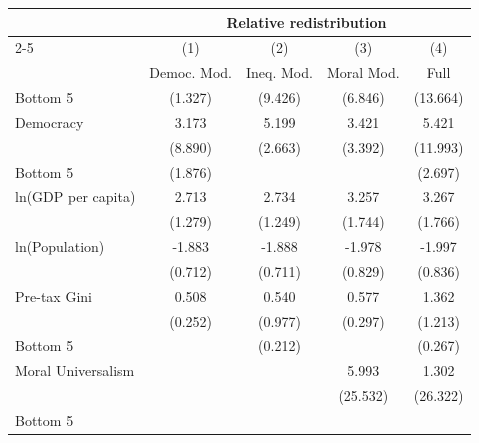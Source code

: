 \begin{tabular}{l*{4}{c}}
\toprule
                    &\multicolumn{4}{c}{Relative redistribution}        \\\cmidrule(lr){2-5}
                    &\multicolumn{1}{c}{(1)}&\multicolumn{1}{c}{(2)}&\multicolumn{1}{c}{(3)}&\multicolumn{1}{c}{(4)}\\
                    &\multicolumn{1}{c}{Democ. Mod.}&\multicolumn{1}{c}{Ineq. Mod.}&\multicolumn{1}{c}{Moral Mod.}&\multicolumn{1}{c}{Full}\\
\midrule
Bottom 5%
                    &     (1.327)&     (9.426)&     (6.846)&    (13.664)\\
\addlinespace
Democracy           &       3.173&       5.199&       3.421&       5.421\\
                    &     (8.890)&     (2.663)&     (3.392)&    (11.993)\\
\addlinespace
Bottom 5%
                    &     (1.876)&            &            &     (2.697)\\
\addlinespace
ln(GDP per capita)  &       2.713&       2.734&       3.257&       3.267\\
                    &     (1.279)&     (1.249)&     (1.744)&     (1.766)\\
\addlinespace
ln(Population)      &      -1.883&      -1.888&      -1.978&      -1.997\\
                    &     (0.712)&     (0.711)&     (0.829)&     (0.836)\\
\addlinespace
Pre-tax Gini        &       0.508&       0.540&       0.577&       1.362\\
                    &     (0.252)&     (0.977)&     (0.297)&     (1.213)\\
\addlinespace
Bottom 5%
                    &            &     (0.212)&            &     (0.267)\\
\addlinespace
Moral Universalism  &            &            &       5.993&       1.302\\
                    &            &            &    (25.532)&    (26.322)\\
\addlinespace
Bottom 5%

\end{tabular}
